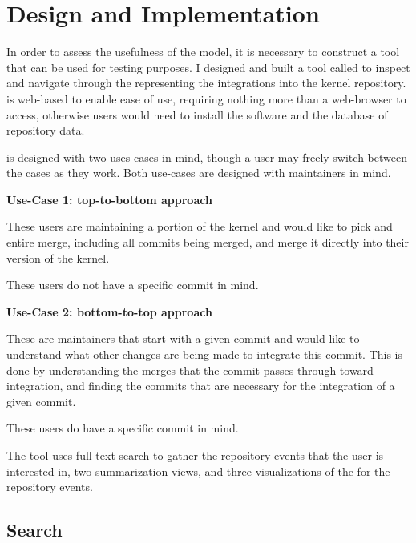 \chapter{Design and Implementation}\label{chap:design_and_implementation}

In order to assess the usefulness of the model, it is necessary to
construct a tool that can be used for testing purposes. I designed and
built a tool called \tool{} to inspect and navigate through the
 representing the integrations into the kernel repository.
\tool{} is web-based to enable ease of use, requiring nothing more than
a web-browser to access, otherwise users would need to install the
software and the database of repository data.

\tool{} is designed with two uses-cases in mind, though a user may
freely switch between the cases as they work. Both use-cases are
designed with maintainers in mind.

\begin{textbox}
  \textbf{Use-Case 1: top-to-bottom approach}

  These users are maintaining a portion of the kernel and would like to
  pick and entire merge, including all commits being merged, and merge
  it directly into their version of the kernel.

  These users do not have a specific commit in mind.
\end{textbox}

\begin{textbox}
  \textbf{Use-Case 2: bottom-to-top approach}

  These are maintainers that start with a given commit and would like to
  understand what other changes are being made to integrate this commit.
  This is done by understanding the merges that the commit passes
  through toward integration, and finding the commits that are necessary
  for the integration of a given commit.

  These users do have a specific commit in mind.
\end{textbox}

The tool uses full-text search to gather the repository events that the
user is interested in, two summarization views, and three visualizations
of the \mt{} for the repository events.

\section{Search}\label{sec:search}

